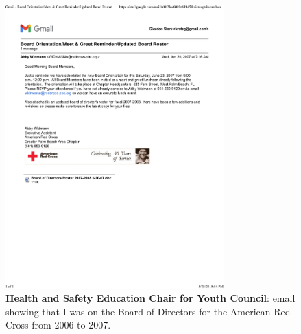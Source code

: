 \begin{figure}[h!]
	\centering
	\caption{\textbf{Health and Safety Education Chair for Youth Council}: email showing that I was on the Board of Directors for the American Red Cross from 2006 to 2007.}
	\includegraphics[width=0.75\textwidth]{attachments/G-outreach/redCrossBoardOfDirectors}
\end{figure}

